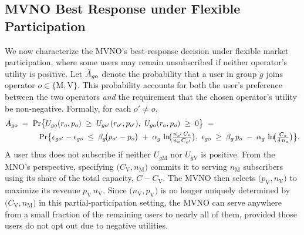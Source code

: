 \documentclass[12pt, draftclsnofoot, onecolumn]{IEEEtran}
\begin{document}
		
		\subsection{MVNO Best Response under Flexible Participation}
		We now characterize the MVNO’s best‐response decision under flexible market participation, where some users may remain unsubscribed if neither operator’s utility is positive. Let \(\tilde{A}_{g{\rm o}}\) denote the probability that a user in group \(g\) joins operator \(o \in \{\mathrm{M},\mathrm{V}\}\). This probability accounts for both the user’s preference between the two operators \emph{and} the requirement that the chosen operator’s utility be non-negative. Formally, for each \(o' \neq o\),
		\begin{align}
			\tilde{A}_{g{\rm o}}
			\;=\;
			\Pr\bigl\{
			U_{g o}(r_o,p_o) \;\ge\;U_{g o'}(r_{o'},p_{o'})&,\ 
			U_{g o}(r_o,p_o)\;\ge\;0
			\bigr\}
			\;=\;\nonumber \\
			\Pr\bigl\{
			\epsilon_{g o'} - \epsilon_{g o}
			\;\le\;
			\beta_{g}\!\bigl(p_{o'}-p_{o}\bigr)
			&\;+\;
			\alpha_{g}\,\ln\!\bigl(\tfrac{n_{o'}\,C_{o}}{n_{o}\,C_{o'}}\bigr),
			\ 
			\epsilon_{g o} 
			\;\ge\;
			\beta_{g}\,p_{o} \;-\;\alpha_{g}\,\ln\!\bigl(\tfrac{C_{o}}{\delta\,n_{o}}\bigr)
			\bigr\}.
		\end{align}
		A user thus does not subscribe if neither \(U_{g\mathrm{M}}\) nor \(U_{g\mathrm{V}}\) is positive. 
		From the MNO’s perspective, specifying \(\bigl(C_{\mathrm{V}},n_{\mathrm{M}}\bigr)\) commits it to serving \(n_{\mathrm{M}}\) subscribers using its share of the total capacity, \(C - C_{\mathrm{V}}\). The MVNO then selects \(\bigl(p_{\mathrm{V}},n_{\mathrm{V}}\bigr)\) to maximize its revenue \(p_{\mathrm{V}}\,n_{\mathrm{V}}\). Since \(\bigl(n_{\mathrm{V}},p_{\mathrm{V}}\bigr)\) is no longer uniquely determined by \(\bigl(C_{\mathrm{V}},n_{\mathrm{M}}\bigr)\) in this partial‐participation setting, the MVNO can serve anywhere from a small fraction of the remaining users to nearly all of them, provided those users do not opt out due to negative utilities.
		
\end{document}

